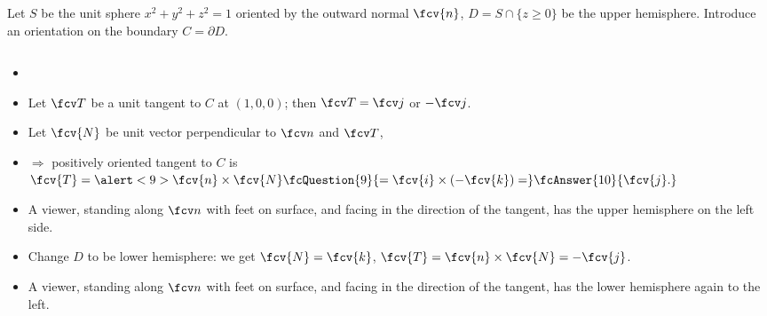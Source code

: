 \begin{frame}
\begin{example}
\begin{columns}
Let $S$ be the unit sphere $x^2+y^2+z^2 = 1$ oriented by the outward normal $\fcv{n}$, $D = S \cap \{z\geq 0\}$ be the upper hemisphere. Introduce an orientation on the boundary $C=\partial D$.

\end{columns}
\begin{itemize}
\item<2->  
\item<4-> Let $\fcv T$ be a unit tangent to $C$ at $(1,0,0)$; then \alert<4>{$\fcv T=\fcv j$ or $-\fcv j$.}
\item<5-> Let $\fcv{N}$ be unit vector perpendicular to $\fcv n$ and $\fcv T$,     
\item<8-> $\Rightarrow$ positively oriented tangent to $C$ is $\fcv{T}= \alert<9>{ \fcv{n} \times \fcv{N}} \fcQuestion{9}{= \fcv{i} \times (-\fcv{k})=} \fcAnswer{10}{ \fcv{j}.}$
\item<12-> A viewer, standing along $\fcv n$ with feet on surface, and facing in the direction of the tangent, has the upper hemisphere on the left side.
\item<13-> Change $D$ to be lower hemisphere: we get $\fcv{N}=\fcv{k}$, $\fcv{T}=\fcv{n}\times \fcv{N} = -\fcv{j}$.
\item<14-> A viewer, standing along $\fcv n$ with feet on surface, and facing in the direction of the tangent, has the lower hemisphere again to the left.
\end{itemize}
\end{example}
\end{frame}